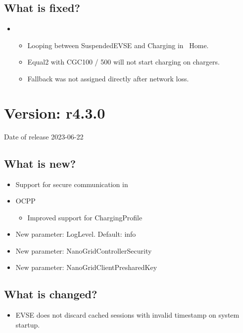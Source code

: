 \documentclass{scrartcl}
\begin{document}
\subsection*{What is fixed?}

\begin{itemize}
\item \nanogrid\
\begin{itemize}
  \item Looping between SuspendedEVSE and Charging in \nanogrid\ Home.
  \item Equal2 with CGC100 / 500 will not start charging on chargers.
  \item Fallback was not assigned directly after network loss.
\end{itemize}
\end{itemize}






\section{Version: r4.3.0}
Date of release 2023-06-22

\subsection*{What is new?}

\begin{itemize}
\item Support for secure communication in \nanogrid\
\item OCPP
    \begin{itemize}
    \item Improved support for ChargingProfile
    \end{itemize}
\item New parameter: LogLevel. Default: info
\item New parameter: NanoGridControllerSecurity
\item New parameter: NanoGridClientPresharedKey
\end{itemize}

\subsection*{What is changed?}

\begin{itemize}
    \item EVSE does not discard cached sessions with invalid timestamp on system startup.
\end{itemize}
\end{document}
